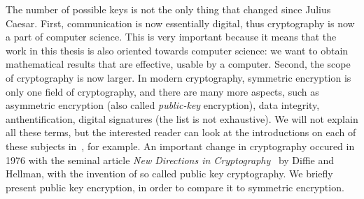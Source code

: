 The number of possible keys is not the only thing that changed since Julius
Caesar. First, communication is now essentially digital, thus cryptography is
now a part of computer science. This is very important because it means that the
work in this thesis is also oriented towards computer science: we want to obtain
mathematical results that are effective, \ie usable by a computer.
Second, the scope of cryptography is now larger.
In modern cryptography, symmetric encryption is only one field of
cryptography, and there are many more aspects, such as asymmetric
encryption (also called \emph{public-key} encryption), data integrity,
anthentification, digital signatures (the list is not exhaustive). We will not
explain all these terms, but the interested reader can look at the introductions
on each of these subjects in~\cite{MVOV18}, for example. An important change in
cryptography occured in 1976 with the seminal article \emph{New Directions in
Cryptography}~\cite{DH76} by Diffie and Hellman, with the invention of so called
public key cryptography. We briefly present public key encryption, in order to
compare it to symmetric encryption.

